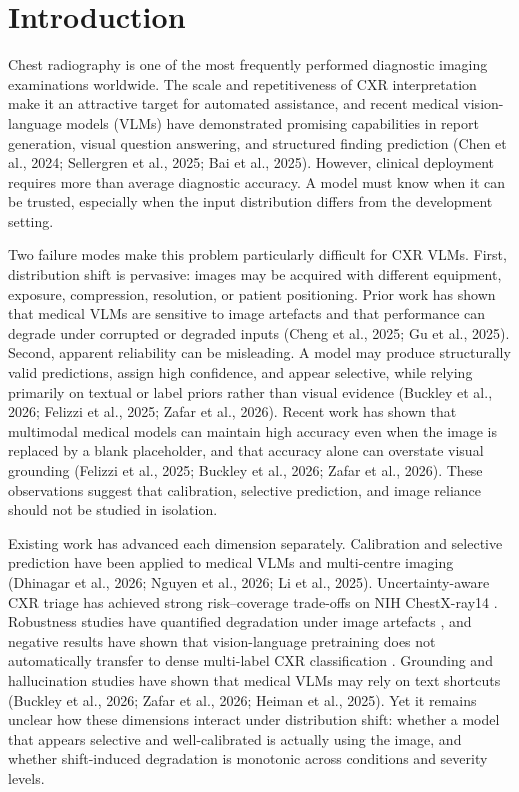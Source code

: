 \section{Introduction}

Chest radiography is one of the most frequently performed diagnostic imaging examinations worldwide. The scale and repetitiveness of CXR interpretation make it an attractive target for automated assistance, and recent medical vision-language models (VLMs) have demonstrated promising capabilities in report generation, visual question answering, and structured finding prediction (Chen et al., 2024; Sellergren et al., 2025; Bai et al., 2025). However, clinical deployment requires more than average diagnostic accuracy. A model must know when it can be trusted, especially when the input distribution differs from the development setting.

Two failure modes make this problem particularly difficult for CXR VLMs. First, distribution shift is pervasive: images may be acquired with different equipment, exposure, compression, resolution, or patient positioning. Prior work has shown that medical VLMs are sensitive to image artefacts and that performance can degrade under corrupted or degraded inputs (Cheng et al., 2025; Gu et al., 2025). Second, apparent reliability can be misleading. A model may produce structurally valid predictions, assign high confidence, and appear selective, while relying primarily on textual or label priors rather than visual evidence (Buckley et al., 2026; Felizzi et al., 2025; Zafar et al., 2026). Recent work has shown that multimodal medical models can maintain high accuracy even when the image is replaced by a blank placeholder, and that accuracy alone can overstate visual grounding (Felizzi et al., 2025; Buckley et al., 2026; Zafar et al., 2026). These observations suggest that calibration, selective prediction, and image reliance should not be studied in isolation.

Existing work has advanced each dimension separately. Calibration and selective prediction have been applied to medical VLMs and multi-centre imaging (Dhinagar et al., 2026; Nguyen et al., 2026; Li et al., 2025). Uncertainty-aware CXR triage has achieved strong risk--coverage trade-offs on NIH ChestX-ray14 \citep{li2025atcxr}. Robustness studies have quantified degradation under image artefacts \citep{cheng2025robustness}, and negative results have shown that vision-language pretraining does not automatically transfer to dense multi-label CXR classification \citep{fisher2025negative}. Grounding and hallucination studies have shown that medical VLMs may rely on text shortcuts (Buckley et al., 2026; Zafar et al., 2026; Heiman et al., 2025). Yet it remains unclear how these dimensions interact under distribution shift: whether a model that appears selective and well-calibrated is actually using the image, and whether shift-induced degradation is monotonic across conditions and severity levels.

